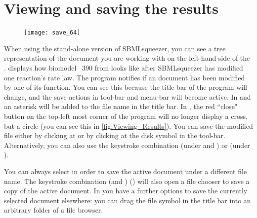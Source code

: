 \section{Viewing and saving the results}

\begin{figure}
\vspace{\wrapfigspace}
\texttt{[image: save\_64]}
\end{figure}
When using the stand-alone version of SBMLsqueezer, you can see a tree representation of the \SBML document you are working with on the left-hand side of the \GUI.
 displays how biomodel \numero~390 from \BioModels \citep{Li2010a} looks like after SBMLsqueezer has modified one reaction's rate law.
The program notifies if an \SBML document has been modified by one of its function.
You can see this because the title bar of the program will change, and the save actions in tool-bar and menu-bar will become active.
In \Windows and \Linux an asterisk will be added to the file name in the title bar.
In \MacOSX, the red ``close" button on the top-left most corner of the program will no longer display a cross, but a circle (you can see this in \vref{fig:Viewing_Results}).
You can save the modified file either by clicking at  or by clicking at the disk symbol in the tool-bar.
Alternatively, you can also use the keystroke combination  (under \Windows and \Linux) or  (under \MacOSX).

You can always select  in order to save the active \SBML document under a different file name.
The keystroke combination  (\Windows and \Linux)  (\MacOSX) will also open a file chooser to save a copy of the active \SBML document.
In \MacOSX you have a further options to save the currently selected document elsewhere: you can drag the file symbol in the title bar into an arbitrary folder of a file browser.

